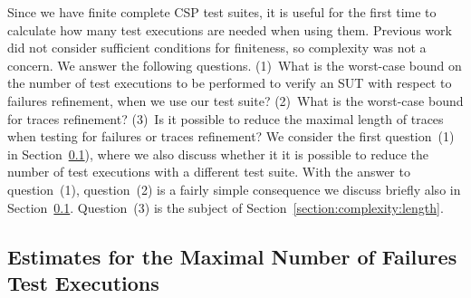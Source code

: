 \documentclass[3p,times]{elsarticle}
\newcommand{\epass}{{\text{\it pass}}}
\newcommand{\minhits}{\text{\it minHit}}
\begin{document}

Since we have finite complete CSP test suites, it is useful for the first
time to calculate how many test executions are needed when using them.
Previous work did not consider sufficient conditions for finiteness, so
complexity was not a concern. We answer the following questions. (1)~What is
the worst-case bound on the number of test executions to be performed to
verify an SUT with respect to failures refinement, when we use our test
suite? (2)~What is the worst-case bound for traces refinement? (3)~Is it
possible to reduce the maximal length of traces when testing for failures or
traces refinement? We consider the first question~(1) in
Section~\ref{section:complexity:failures}), where we also discuss whether it
it is possible to reduce the number of test executions with a different test
suite.  With the answer to question~(1), question~(2) is a fairly simple
consequence we discuss briefly also in
Section~\ref{section:complexity:failures}. Question~(3) is the subject of
Section~\ref{section:complexity:length}.

\subsection{Estimates for the Maximal Number of Failures Test Executions}
\label{section:complexity:failures}
\end{document}
